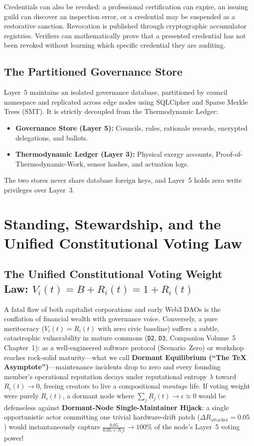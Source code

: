 Credentials can also be revoked: a professional certification can expire, an issuing guild can discover an inspection error, or a credential may be suspended as a restorative sanction. Revocation is published through cryptographic accumulator registries. Verifiers can mathematically prove that a presented credential has not been revoked without learning which specific credential they are auditing.

\subsection{The Partitioned Governance Store}

Layer~5 maintains an isolated governance database, partitioned by council namespace and replicated across edge nodes using SQLCipher and Sparse Merkle Trees (SMT). It is strictly decoupled from the Thermodynamic Ledger:
\begin{itemize}
  \item \textbf{Governance Store (Layer 5):} Councils, rules, rationale records, encrypted delegations, and ballots.
  \item \textbf{Thermodynamic Ledger (Layer 3):} Physical exergy accounts, Proof-of-Thermodynamic-Work, sensor hashes, and actuation logs.
\end{itemize}
The two stores never share database foreign keys, and Layer~5 holds zero write privileges over Layer~3.

\section{Standing, Stewardship, and the Unified Constitutional Voting Law}
\label{sec:l5-standing}

\subsection{The Unified Constitutional Voting Weight Law: \texorpdfstring{$V_i(t) = B + R_i(t) = 1 + R_i(t)$}{V\_i(t) = 1 + R\_i(t)}}

A fatal flaw of both capitalist corporations and early Web3 DAOs is the conflation of financial wealth with governance voice. Conversely, a pure meritocracy ($V_i(t) = R_i(t)$ with zero civic baseline) suffers a subtle, catastrophic vulnerability in mature commons (\texttt{D2}, \texttt{D3}, Companion Volume~5 Chapter~1): as a well-engineered software protocol (Scenario~Zero) or workshop reaches rock-solid maturity---what we call \textbf{Dormant Equilibrium (``The \TeX{} Asymptote'')}---maintenance incidents drop to zero and every founding member's operational reputation decays under reputational entropy $\lambda$ toward $R_i(t) \to 0$, freeing creators to live a compositional \textit{montage} life. If voting weight were purely $R_i(t)$, a dormant node where $\sum_j R_j(t) \to \epsilon \approx 0$ would be defenseless against \textbf{Dormant-Node Single-Maintainer Hijack}: a single opportunistic actor committing one trivial hardware-drift patch ($\Delta R_{\mathrm{attacker}} = 0.05$) would instantaneously capture $\frac{0.05}{0.05 + N_s \epsilon} \to 100\%$ of the node's Layer~5 voting power!

